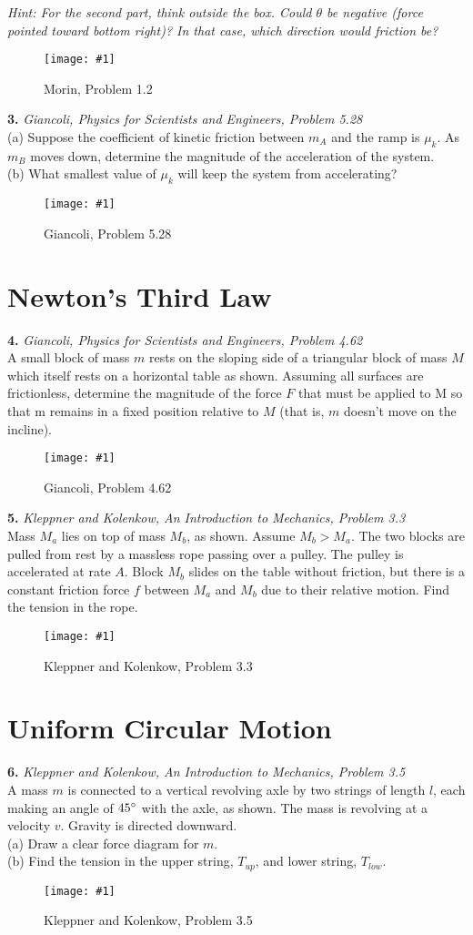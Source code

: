 \documentclass[11pt]{article}
\newcommand{\fig}[4]{
    \begin{figure}[H]
        \centering
        \texttt{[image: \#1]}
        \caption{#2}
        \label{exp4fit}
    \end{figure}
}
\theoremstyle{gangnamstyle}{\newtheorem{definition}{Definition}[]}
\theoremstyle{gangnamstyle}{\newtheorem{example}{Example}[]}
\theoremstyle{gangnamstyle}{\newtheorem{problem}{Problem}[]}
\begin{document}
\textit{Hint: For the second part, think outside the box. Could $\theta$ be negative (force pointed toward bottom right)? In that case, which direction would friction be?}
\fig{figs/0627/morin12.png}{Morin, Problem 1.2}{0.7}{0}
\pagebreak

\textbf{3.} \textit{Giancoli, Physics for Scientists and Engineers, Problem 5.28} \\
(a) Suppose the coefficient of kinetic friction between $m_A$ and the ramp is $\mu_k$. As $m_B$ moves down, determine the magnitude of the acceleration of the system. \\
(b) What smallest value of $\mu_k$ will keep the system from accelerating?
\fig{figs/0627/giancoli528.png}{Giancoli, Problem 5.28}{0.7}{0}

\pagebreak

\section{Newton's Third Law}

\textbf{4.} \textit{Giancoli, Physics for Scientists and Engineers, Problem 4.62} \\
A small block of mass $m$ rests on the sloping side of a triangular block of mass $M$ which itself rests on a horizontal table as shown. Assuming all surfaces are frictionless, determine the magnitude of the force $F$ that must be applied to M so that m remains in a fixed position relative to $M$ (that is, $m$
doesn’t move on the incline). 
\fig{figs/0627/giancoli462.png}{Giancoli, Problem 4.62}{0.7}{0}

\pagebreak

\textbf{5.} \textit{Kleppner and Kolenkow, An Introduction to Mechanics, Problem 3.3} \\
Mass $M_a$ lies on top of mass $M_b$, as shown. Assume $M_b > M_a$. The two blocks are pulled from rest by a massless rope passing over a pulley. The pulley is accelerated at rate $A$. Block $M_b$ slides on the table without friction, but there is a constant friction force $f$ between $M_a$ and $M_b$ due to their relative motion. Find the tension in the rope.
\fig{figs/0627/kk33.png}{Kleppner and Kolenkow, Problem 3.3}{0.7}{0}

\pagebreak

\section{Uniform Circular Motion}
\textbf{6.} \textit{Kleppner and Kolenkow, An Introduction to Mechanics, Problem 3.5} \\
A mass $m$ is connected to a vertical revolving axle by two strings of length $l$, each making an angle of $45\degree$ with the axle, as shown. The mass is revolving at a velocity $v$. Gravity is directed downward. \\
(a) Draw a clear force diagram for $m$. \\
(b) Find the tension in the upper string, $T_{up}$, and lower string, $T_{low}$. 
\fig{figs/0627/kk35.png}{Kleppner and Kolenkow, Problem 3.5}{0.6}{0}
\end{document}
